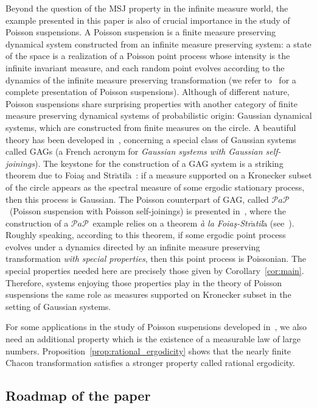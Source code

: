 \documentclass[AHL,Unicode,longabstracts]{cedram}
\newcommand{\PaP}{$\mathcal{P}a\mathcal{P}$}
\begin{document}
Beyond the question of the MSJ property in the infinite measure world, the example presented in this paper is also of crucial importance in the study of Poisson suspensions. A Poisson suspension is a finite measure preserving dynamical system constructed from an infinite measure preserving system: a state of the space is a realization of a Poisson point process whose intensity is the infinite invariant measure, and each random point evolves according to the dynamics of the infinite measure preserving transformation (we refer to~\cite{Roy2007} for a complete presentation of Poisson suspensions). Although of different nature, Poisson suspensions share surprising properties with another category of finite measure preserving dynamical systems of probabilistic origin: Gaussian dynamical systems, which are constructed from finite measures on the circle. A beautiful theory has been developed in~\cite{LemParThou00Gausselfjoin}, concerning a special class of Gaussian systems called GAGs (a French acronym for \emph{Gaussian systems with Gaussian self-joinings}). The keystone for the construction of a GAG system is a striking theorem due to Foia\c{s} and Str$\breve{\mathrm{a}}$til$\breve{\mathrm{a}}$~\cite{FoiasStratila}: if a measure supported on a Kronecker subset of the circle appears as the spectral measure of some ergodic stationary process, then this process is Gaussian. The Poisson counterpart of GAG, called \PaP\ (Poisson suspension with Poisson self-joinings) is presented in~\cite{sushis}, where the construction of a
\PaP\ example relies on a theorem \emph{\`a la Foia\c{s}-Str$\breve{\mathrm{a}}$til$\breve{\mathrm{a}}$} (see~\cite[Theorem~3.4]{sushis}). Roughly speaking, according to this theorem, if some ergodic point process evolves under a dynamics directed by an infinite measure preserving transformation \emph{with special properties}, then this point process is Poissonian. The special properties needed here are precisely those given by Corollary~\ref{cor:main}. Therefore, systems enjoying those properties play in the theory of Poisson suspensions the same role as measures supported on Kronecker subset in the setting of Gaussian systems.

For some applications in the study of Poisson suspensions developed in~\cite{sushis}, we also need an additional property which is the existence of a measurable law of large numbers. Proposition~\ref{prop:rational_ergodicity} shows that the nearly finite Chacon transformation satisfies a stronger property called rational ergodicity.

\subsection{Roadmap of the paper}
\end{document}
